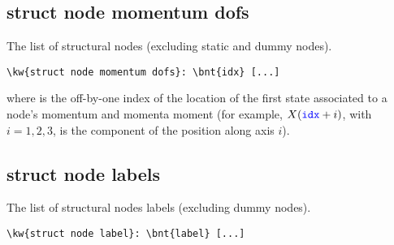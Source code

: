 \subsection{struct node momentum dofs}
The list of structural nodes (excluding static and dummy nodes).
\begin{Verbatim}[commandchars=\\\{\}]
\kw{struct node momentum dofs}: \bnt{idx} [...]
\end{Verbatim}
where  is the off-by-one index of the location of the first
state associated to a node's momentum and momenta moment
(for example, $X(\textcolor{blue}{\texttt{idx}} + i)$, with $i = 1,2,3$,
is the component of the position along axis $i$).

\subsection{struct node labels}
The list of structural nodes labels (excluding dummy nodes).
\begin{Verbatim}[commandchars=\\\{\}]
\kw{struct node label}: \bnt{label} [...]
\end{Verbatim}

